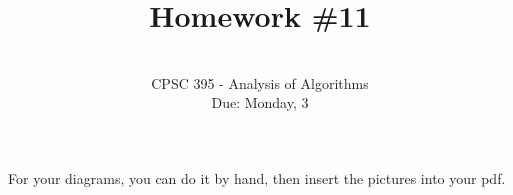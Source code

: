 \documentclass[12pt]{article}
\begin{document}
 
 
 
\title{Homework \#11}%
\author{\\ %
CPSC 395 - Analysis of Algorithms
\\ Due: Monday, 3} %
\date{}
\maketitle

For your diagrams, you can do it by hand, then insert the pictures into your pdf.
\end{document}
